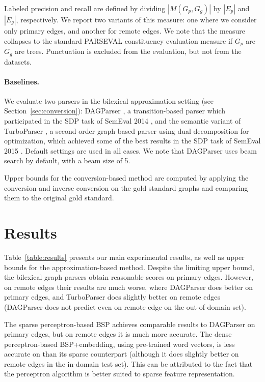\documentclass[11pt]{article}
\newcommand{\secref}[1]{Section~\ref{#1}}
\newcommand{\tabref}[1]{Table~\ref{#1}}
\begin{document}
\vspace{-.6cm}

Labeled precision and recall are defined by dividing $|M(G_p,G_g)|$ by $|E_p|$ and $|E_g|$, respectively.
We report two variants of this measure: one where we consider only primary edges,
and another for remote edges. We note that the measure collapses to the standard
PARSEVAL constituency evaluation measure if $G_p$ are $G_g$ are trees.
Punctuation is excluded from the evaluation, but not from the datasets.

\paragraph{Baselines.}
We evaluate two parsers in the bilexical approximation setting (see \secref{sec:conversion}):
DAGParser \cite{ribeyre-villemontedelaclergerie-seddah:2014:SemEval}, a transition-based parser
which participated in the SDP task of SemEval 2014 \cite{oepen2014semeval},
and the semantic variant of TurboParser \cite{almeida-martins:2015:SemEval},
a second-order graph-based parser using
dual decomposition for optimization, which achieved some of the best results
in the SDP task of SemEval 2015 \cite{oepen2015semeval}.
Default settings are used in all cases.
We note that DAGParser uses beam search by default, with a beam size of 5.

Upper bounds for the conversion-based method are computed by applying
the conversion and inverse conversion on the gold standard
graphs and comparing them to the original gold standard.

\section{Results}\label{sec:results}

\tabref{table:results} presents our main experimental results, as well as
upper bounds for the approximation-based method.
Despite the limiting upper bound, the bilexical graph parsers obtain reasonable scores on
primary edges. However, on remote edges their results are much worse, where
DAGParser \cite{ribeyre-villemontedelaclergerie-seddah:2014:SemEval} does better on primary edges,
and TurboParser \cite{almeida-martins:2015:SemEval} does slightly better on remote edges
(DAGParser does not predict even on remote edge on the out-of-domain set).

The sparse perceptron-based BSP achieves comparable results to DAGParser on primary edges, but
on remote edges it is much more accurate.
The dense perceptron-based BSP+embedding, using pre-trained word vectors, is less accurate on
than its sparse counterpart (although it does slightly better on remote edges in the in-domain
test set). This can be attributed to the fact that the perceptron algorithm is better suited to
sparse feature representation.
\end{document}
